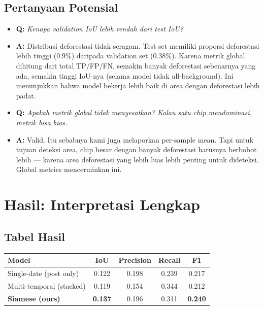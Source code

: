 \documentclass[10pt,a4paper,onecolumn]{article}
\begin{document}
\subsection{Pertanyaan Potensial}

\begin{itemize}
    \item{\textbf{Q:} \textit{Kenapa validation IoU lebih rendah dari
          test IoU?}}
    \item{\textbf{A:} Distribusi deforestasi tidak seragam. Test set
          memiliki proporsi deforestasi lebih tinggi (0.9\%) daripada
          validation set (0.38\%). Karena metrik global dihitung dari
          total TP/FP/FN, semakin banyak deforestasi sebenarnya yang
          ada, semakin tinggi IoU-nya (selama model tidak
          all-background). Ini menunjukkan bahwa model bekerja lebih
          baik di area dengan deforestasi lebih padat.}
\end{itemize}

\begin{itemize}
    \item{\textbf{Q:} \textit{Apakah metrik global tidak menyesatkan?
          Kalau satu chip mendominasi, metrik bisa bias.}}
    \item{\textbf{A:} Valid. Itu sebabnya kami juga melaporkan
          per-sample mean. Tapi untuk tujuan deteksi area, chip besar
          dengan banyak deforestasi harusnya berbobot lebih —
          karena area deforestasi yang lebih luas lebih penting untuk
          dideteksi. Global metrics mencerminkan ini.}
\end{itemize}

\section{Hasil: Interpretasi Lengkap}

\subsection{Tabel Hasil}

\begin{table}[ht]
\centering
\small
\begin{tabular}{lcccc}
\toprule
\textbf{Model} & \textbf{IoU} & \textbf{Precision} & \textbf{Recall} & \textbf{F1} \\
\midrule
Single-date (post only) & 0.122 & 0.198 & 0.239 & 0.217 \\
Multi-temporal (stacked) & 0.119 & 0.154 & 0.344 & 0.212 \\
\textbf{Siamese (ours)} & \textbf{0.137} & 0.196 & 0.311 & \textbf{0.240} \\
\bottomrule
\end{tabular}
\end{table}
\end{document}
